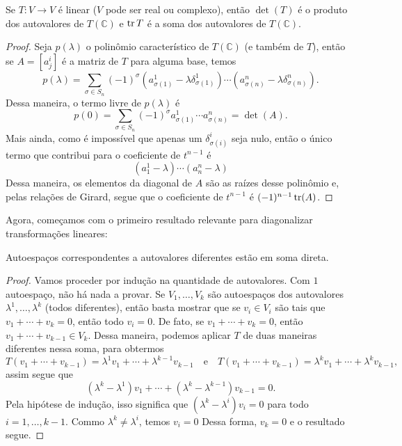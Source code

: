 \begin{proposition}
    Se $T \colon V \to V$ é linear ($V$ pode ser real ou complexo), então $\det(T)$ é o produto dos autovalores de $T(\mathbb{C})$ e $\operatorname{tr} T$ é a soma dos autovalores de $T(\mathbb{C})$.
\end{proposition}
\begin{proof}
    Seja $p(\lambda)$ o polinômio característico de $T(\mathbb{C})$ (e também de $T$), então se $A = [a^i_j]$ é a matriz de $T$ para alguma base, temos \begin{equation}
        p(\lambda) = \sum_{\sigma \in S_n} (-1)^\sigma (a^1_{\sigma(1)} - \lambda \delta^1_{\sigma(1)}) \cdots (a^n_{\sigma(n)} - \lambda \delta^n_{\sigma(n)}).
    \end{equation} Dessa maneira, o termo livre de $p(\lambda)$ é \begin{equation}
        p(0) = \sum_{\sigma \in S_n} (-1)^\sigma a^1_{\sigma(1)} \cdots a^n_{\sigma(n)} = \det(A).
    \end{equation} Mais ainda, como é impossível que apenas um $\delta^i_{\sigma(i)}$ seja nulo, então o único termo que contribui para o coeficiente de $t^{n-1}$ é \begin{equation}
        (a^1_1 - \lambda) \cdots (a^n_n - \lambda)
    \end{equation} Dessa maneira, os elementos da diagonal de $A$ são as raízes desse polinômio e, pelas relações de Girard, segue que o coeficiente de $t^{n-1}$ é $(-1)^{n-1} \operatorname{tr}(A)$.
\end{proof}

Agora, começamos com o primeiro resultado relevante para diagonalizar transformações lineares:

\begin{proposition}
    Autoespaços correspondentes a autovalores diferentes estão em soma direta.
\end{proposition}
\begin{proof}
    Vamos proceder por indução na quantidade de autovalores. Com $1$ autoespaço, não há nada a provar. Se $V_1, \dots, V_k$ são autoespaços dos autovalores $\lambda^1, \dots, \lambda^k$ (todos diferentes), então basta mostrar que se $v_i \in V_i$ são tais que $v_1 + \cdots + v_k = 0$, então todo $v_i = 0$. De fato, se $v_1 + \cdots + v_k = 0$, então $v_1 + \cdots + v_{k-1} \in V_k$. Dessa maneira, podemos aplicar $T$ de duas maneiras diferentes nessa soma, para obtermos \begin{equation}
        T(v_1 + \cdots + v_{k-1}) = \lambda^1 v_1 + \cdots + \lambda^{k-1} v_{k-1} \quad \text{e} \quad T(v_1 + \cdots + v_{k-1}) = \lambda^k v_1 + \cdots + \lambda^k v_{k-1},
    \end{equation} assim segue que \begin{equation}
        (\lambda^k - \lambda^1) v_1 + \cdots + (\lambda^k - \lambda^{k-1}) v_{k-1} = 0.
    \end{equation} Pela hipótese de indução, isso significa que $(\lambda^k - \lambda^i) v_i = 0$ para todo $i = 1, \dots, k-1$. Commo $\lambda^k \neq \lambda^i$, temos $v_i = 0$ Dessa forma, $v_k = 0$ e o resultado segue.
\end{proof}

